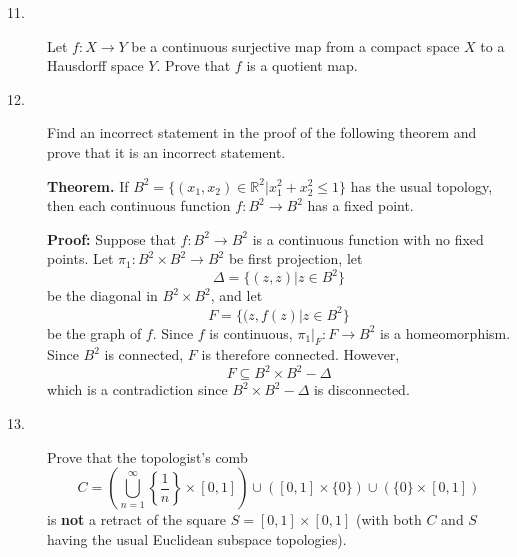 \documentclass{article}
\def\R{\mathbb R}
\begin{document}
\begin{description}
\item[11.]
Let $f : X \to Y$ be a continuous surjective map from a compact space $X$ to
a Hausdorff space $Y$. Prove that $f$ is a quotient map.

\item[12.]
Find an incorrect statement in the proof of the following theorem and prove
that it is an incorrect statement.

{\bf Theorem.}
If $B^2 = \{(x_1, x_2) \in \R^2 |x_1^2 + x^2_2 \leq 1\}$
has the usual topology, then each continuous function $f : B^2 \to B^2$
has a fixed point.

{\bf Proof:}
Suppose that $f : B^2 \to B^2$ is a continuous function with no fixed points.
Let $\pi_1: B^2 \times B^2 \to B^2$ be first projection, let
$$\Delta = \{(z,z) |z \in B^2\}$$
be the diagonal in $B^2 \times B^2$, and let
$$F = \{(z, f(z)|z \in B^2\}$$
be the graph of $f$. Since $f$ is continuous, $\pi_1|_F : F \to B^2$ is a
homeomorphism. Since $B^2$ is connected, $F$ is therefore connected. However,
$$F \subseteq B^2 \times B^2 - \Delta$$
which is a contradiction since $B^2 \times B^2 - \Delta$ is disconnected.

\item[13.]
Prove that the topologist's comb
$$C= \left( \bigcup^\infty_{n=1} \left\{\frac{1}{n} \right\} \times
  [0,1] \right) \cup \left( [0,1] \times \{0\} \right) \cup
  \left( \{0\} \times [0,1] \right)$$
is {\bf not} a retract of the square $S=[0,1] \times [0,1]$
(with both $C$ and $S$ having the usual Euclidean subspace topologies).





\end{description}    
\end{document}
